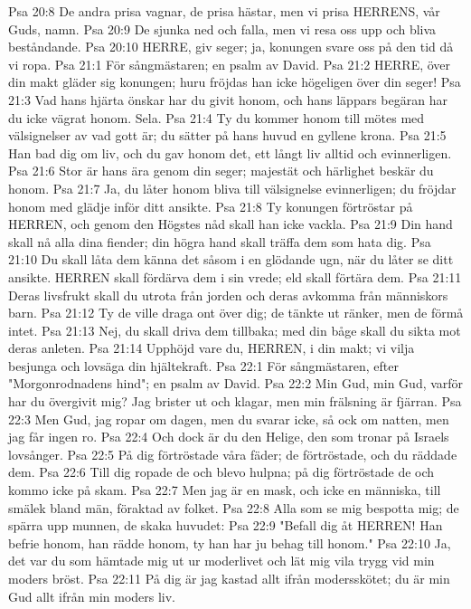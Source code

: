 Psa 20:8  De andra prisa vagnar, de prisa hästar, men vi prisa HERRENS, vår Guds, namn.
Psa 20:9  De sjunka ned och falla, men vi resa oss upp och bliva beståndande.
Psa 20:10  HERRE, giv seger; ja, konungen svare oss på den tid då vi ropa.
Psa 21:1  För sångmästaren; en psalm av David.
Psa 21:2  HERRE, över din makt gläder sig konungen; huru fröjdas han icke högeligen över din seger!
Psa 21:3  Vad hans hjärta önskar har du givit honom, och hans läppars begäran har du icke vägrat honom. Sela.
Psa 21:4  Ty du kommer honom till mötes med välsignelser av vad gott är; du sätter på hans huvud en gyllene krona.
Psa 21:5  Han bad dig om liv, och du gav honom det, ett långt liv alltid och evinnerligen.
Psa 21:6  Stor är hans ära genom din seger; majestät och härlighet beskär du honom.
Psa 21:7  Ja, du låter honom bliva till välsignelse evinnerligen; du fröjdar honom med glädje inför ditt ansikte.
Psa 21:8  Ty konungen förtröstar på HERREN, och genom den Högstes nåd skall han icke vackla.
Psa 21:9  Din hand skall nå alla dina fiender; din högra hand skall träffa dem som hata dig.
Psa 21:10  Du skall låta dem känna det såsom i en glödande ugn, när du låter se ditt ansikte. HERREN skall fördärva dem i sin vrede; eld skall förtära dem.
Psa 21:11  Deras livsfrukt skall du utrota från jorden och deras avkomma från människors barn.
Psa 21:12  Ty de ville draga ont över dig; de tänkte ut ränker, men de förmå intet.
Psa 21:13  Nej, du skall driva dem tillbaka; med din båge skall du sikta mot deras anleten.
Psa 21:14  Upphöjd vare du, HERREN, i din makt; vi vilja besjunga och lovsäga din hjältekraft.
Psa 22:1  För sångmästaren, efter "Morgonrodnadens hind"; en psalm av David.
Psa 22:2  Min Gud, min Gud, varför har du övergivit mig? Jag brister ut och klagar, men min frälsning är fjärran.
Psa 22:3  Men Gud, jag ropar om dagen, men du svarar icke, så ock om natten, men jag får ingen ro.
Psa 22:4  Och dock är du den Helige, den som tronar på Israels lovsånger.
Psa 22:5  På dig förtröstade våra fäder; de förtröstade, och du räddade dem.
Psa 22:6  Till dig ropade de och blevo hulpna; på dig förtröstade de och kommo icke på skam.
Psa 22:7  Men jag är en mask, och icke en människa, till smälek bland män, föraktad av folket.
Psa 22:8  Alla som se mig bespotta mig; de spärra upp munnen, de skaka huvudet:
Psa 22:9  "Befall dig åt HERREN! Han befrie honom, han rädde honom, ty han har ju behag till honom."
Psa 22:10  Ja, det var du som hämtade mig ut ur moderlivet och lät mig vila trygg vid min moders bröst.
Psa 22:11  På dig är jag kastad allt ifrån modersskötet; du är min Gud allt ifrån min moders liv.
